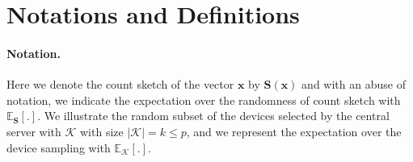 \documentclass[sigconf, anonymous, review]{acmart}
\begin{document}







\newpage
\section{Notations and Definitions}\label{app:notations}

\paragraph{Notation.} Here we denote the count sketch of the vector $\boldsymbol{x}$ by $\mathbf{S}(\boldsymbol{x})$ and with an abuse of notation, we indicate the expectation over the randomness of count sketch with $\mathbb{E}_{\mathbf{S}}[.]$. 
We illustrate the random subset of the devices selected by the central server with $\mathcal{K}$ with size $|\mathcal{K}|=k\leq p$, and we represent the expectation over the device sampling with $\mathbb{E}_{\mathcal{K}}[.]$. 
 
\end{document}
